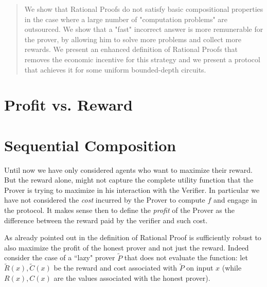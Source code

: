\begin{abstract}
We show that Rational Proofs  do not satisfy basic compositional properties in the case where a large number of "computation problems" are outsourced. We show that a "fast" incorrect answer is more remunerable for the prover, by allowing him to solve more problems and collect more rewards.
We present an enhanced definition of Rational Proofs that removes the economic incentive  for this strategy and we present a protocol that achieves it for
some
uniform bounded-depth circuits.
\end{abstract}

%

%

%

\section{Profit vs. Reward}


\section{Sequential Composition}
Until now we have only considered agents who want to maximize their reward. But the reward alone, might not capture the complete utility function that the Prover is trying to maximize in his interaction with the Verifier. In particular we have not considered the 
{\em cost} incurred by the Prover to compute $f$ and engage in the protocol. It makes 
sense then to define the  {\em profit} of the Prover as the difference between the reward paid by the verifier and such cost. 


As already pointed out in \cite{am1,ratargs} the definition of Rational Proof is sufficiently robust to also maximize the profit of the honest prover and not just the reward. Indeed consider the case of a ``lazy" prover $\tilde{P}$ that does not evaluate the function: let $\tilde{R}(x), \tilde{C}(x)$ be the reward and cost associated with $\tilde{P}$ on input $x$ (while $R(x),C(x)$ are the values associated with the honest prover). 


